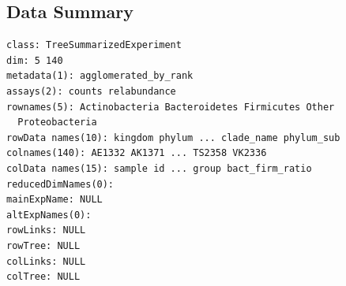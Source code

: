 \documentclass[
  letterpaper,
  DIV=11,
  numbers=noendperiod]{scrartcl}
\begin{document}
\subsection{Data Summary}\label{data-summary}

\begin{verbatim}
class: TreeSummarizedExperiment 
dim: 5 140 
metadata(1): agglomerated_by_rank
assays(2): counts relabundance
rownames(5): Actinobacteria Bacteroidetes Firmicutes Other
  Proteobacteria
rowData names(10): kingdom phylum ... clade_name phylum_sub
colnames(140): AE1332 AK1371 ... TS2358 VK2336
colData names(15): sample id ... group bact_firm_ratio
reducedDimNames(0):
mainExpName: NULL
altExpNames(0):
rowLinks: NULL
rowTree: NULL
colLinks: NULL
colTree: NULL
\end{verbatim}
\end{document}
